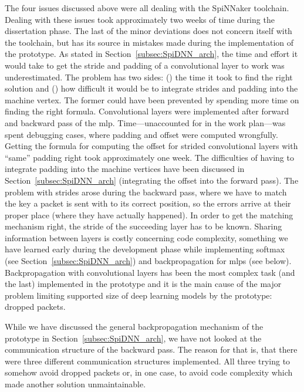 \documentclass[]{article}
\begin{document}
The four issues discussed above were all dealing with the SpiNNaker
toolchain.
Dealing with these issues took approximately two weeks of time during
the dissertation phase.
The last of the minor deviations does not concern itself with the
toolchain, but has its source in mistakes made during the
implementation of the prototype.
As stated in Section~\ref{subsec:SpiDNN_arch}, the time and effort
it would take to get the stride and padding of a convolutional layer
to work was underestimated.
The problem has two sides: () the time it took to find
the right solution and () how difficult it would be
to integrate strides and padding into the machine vertex.
The former could have been prevented by spending more time
on finding the right formula.
Convolutional layers were implemented after forward and backward pass
of the \acrshort{mlp}.
Time---unaccounted for in the work plan---was spent debugging cases,
where padding and offset were computed wrongfully.
Getting the formula for computing the offset for strided convolutional
layers with ``same'' padding right took approximately one week.
The difficulties of having to integrate padding into the machine
vertices have been discussed in Section~\ref{subsec:SpiDNN_arch}
(integrating the offset into the forward pass).
The problem with strides arose during the backward pass, where we
have to match the key a packet is sent with to its correct position,
so the errors arrive at their proper place (where they have actually
happened).
In order to get the matching mechanism right, the stride of the
succeeding layer has to be known.
Sharing information between layers is costly concerning code
complexity, something we have learned early during the development
phase while implementing softmax (see
Section~\ref{subsec:SpiDNN_arch}) and backpropagation for \acrshort{mlp}s (see
below).
Backpropagation with convolutional layers has been the most complex
task (and the last) implemented in the prototype and it is the main
cause of the major problem limiting supported size of deep learning
models by the prototype: dropped packets.

While we have discussed the general backpropagation mechanism of the
prototype in Section~\ref{subsec:SpiDNN_arch}, we have not looked at
the communication structure of the backward pass.
The reason for that is, that there were three different
communication structures implemented.
All three trying to somehow avoid dropped packets or, in one case,
to avoid code complexity which made another solution unmaintainable.
\end{document}
